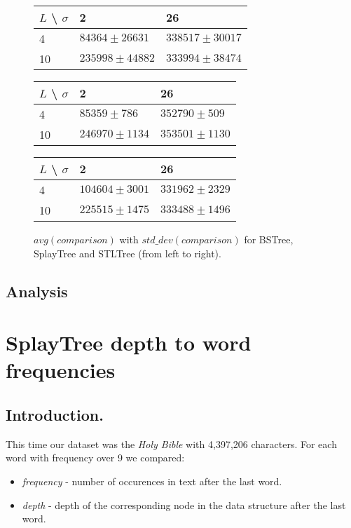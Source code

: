\documentclass[12pt,a4paper]{article}
\begin{document}
\begin{figure}[h]
  \centering
  \begin{tabular}{|l|l|l|}
    \hline
    $L$ \textbackslash{} $\sigma$ & 2 & 26 \\
    \hline
    4  & $84364 \pm 26631$ & $338517 \pm 30017$ \\
    \hline
    10 & $235998 \pm 44882$ & $333994 \pm 38474$ \\
    \hline
  \end{tabular}
  \begin{tabular}{|l|l|l|}
    \hline
    $L$ \textbackslash{} $\sigma$ & 2 & 26 \\
    \hline
    4  & $85359 \pm 786$ & $352790 \pm 509$ \\
    \hline
    10 & $246970 \pm 1134$ & $353501 \pm 1130$ \\
    \hline
  \end{tabular}
  \begin{tabular}{|l|l|l|}
    \hline
    $L$ \textbackslash{} $\sigma$ & 2 & 26 \\
    \hline
    4  & $104604 \pm 3001$ & $331962 \pm 2329$ \\
    \hline
    10 & $225515 \pm 1475$ & $333488 \pm 1496$ \\
    \hline
  \end{tabular}
  \caption{$avg(comparison)$ with $std\_dev(comparison)$ for BSTree, SplayTree and STLTree (from left to right).}
  \label{fig:avg_std_comparison}
\end{figure}

\subsection{Analysis} 

\newpage
\section{SplayTree depth to word frequencies}
\subsection{Introduction.} 
This time our dataset was the \emph{Holy Bible} with 4,397,206 characters. For each word with frequency over 9 we compared:
\begin{itemize} 
\item \emph{frequency} - number of occurences in text after the last word. 
\item \emph{depth} - depth of the corresponding node in the data structure after the last word. 
\end{itemize} 
\end{document}
